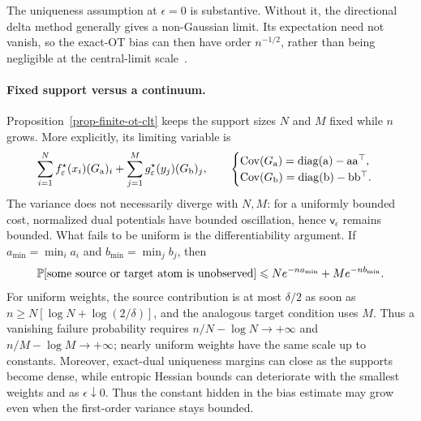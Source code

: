 The uniqueness assumption at \(\epsilon=0\) is substantive. Without it, the directional delta method generally gives a non-Gaussian limit. Its expectation need not vanish, so the exact-OT bias can then have order \(n^{-1/2}\), rather than being negligible at the central-limit scale~\cite{sommerfeld2018inference,tameling2017empirical}.

\paragraph{Fixed support versus a continuum.}
Proposition~\ref{prop-finite-ot-clt} keeps the support sizes \(N\) and \(M\) fixed while \(n\) grows. More explicitly, its limiting variable is
\[
	\sum_{i=1}^{N}f_\varepsilon^\star(x_i)(G_{\mathrm{a}})_i
	+
	\sum_{j=1}^{M}g_\varepsilon^\star(y_j)(G_{\mathrm{b}})_j,
	\qquad
	\begin{cases}
	\operatorname{Cov}(G_{\mathrm{a}})=\operatorname{diag}(\mathrm{a})-\mathrm{a}\mathrm{a}^\top,\\
	\operatorname{Cov}(G_{\mathrm{b}})=\operatorname{diag}(\mathrm{b})-\mathrm{b}\mathrm{b}^\top.
	\end{cases}
\]
The variance does not necessarily diverge with \(N,M\): for a uniformly bounded cost, normalized dual potentials have bounded oscillation, hence \(\mathsf{v}_\epsilon\) remains bounded. What fails to be uniform is the differentiability argument. If \(a_{\min}=\min_i a_i\) and \(b_{\min}=\min_j b_j\), then
\[
	\mathbb{P}[\text{some source or target atom is unobserved}]
	\leqslant
	N e^{-n a_{\min}}+M e^{-n b_{\min}}.
\]
For uniform weights, the source contribution is at most $\delta/2$ as soon as $n\geq N[\log N+\log(2/\delta)]$, and the analogous target condition uses $M$. Thus a vanishing failure probability requires $n/N-\log N\to+\infty$ and $n/M-\log M\to+\infty$; nearly uniform weights have the same scale up to constants. Moreover, exact-dual uniqueness margins can close as the supports become dense, while entropic Hessian bounds can deteriorate with the smallest weights and as \(\epsilon\downarrow0\). Thus the constant hidden in the bias estimate may grow even when the first-order variance stays bounded.

